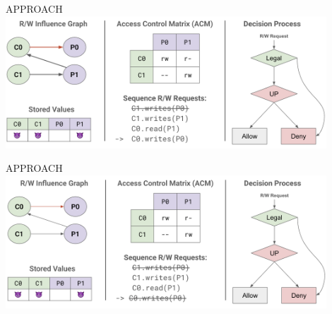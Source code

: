 \begin{frame}{APPROACH}
    \centering
    \includegraphics[height=0.9\textheight,width=0.9\textwidth,keepaspectratio]{slide 4.png}
\end{frame}

\begin{frame}{APPROACH}
    \centering
    \includegraphics[height=0.9\textheight,width=0.9\textwidth,keepaspectratio]{slide 5.png}
\end{frame}


